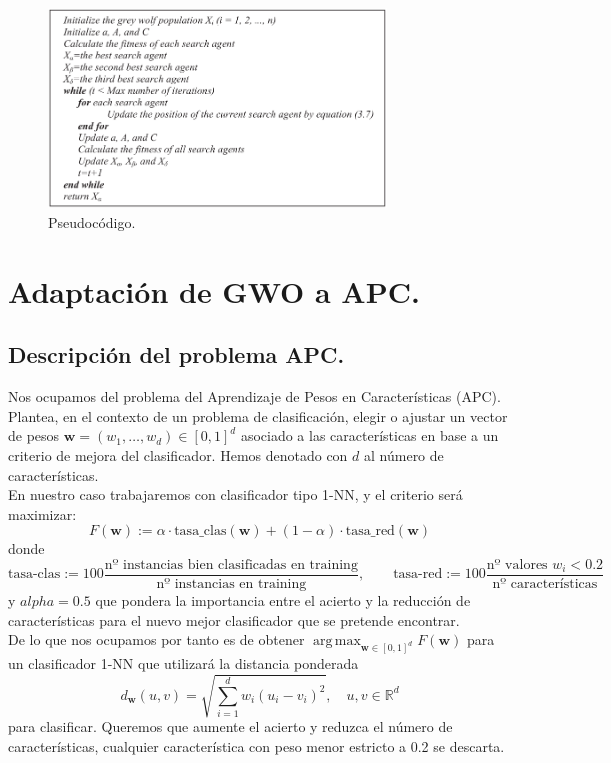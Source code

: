 \documentclass[11pt,a4paper]{article}
\DeclareMathOperator*{\argmax}{arg\,max}
\theoremstyle{definition}
\newcommand{\R}{\mathbb{R}}
\begin{document}
	\begin{figure}[H]
		\centering
		\includegraphics[width=0.8\textwidth]{images/gwo_pseudocode.png}
		\caption{Pseudocódigo.}
	\end{figure}

	\section{Adaptación de GWO a APC.}
	\subsection{Descripción del problema APC.}
	Nos ocupamos del problema del Aprendizaje de Pesos en Características (APC). Plantea, en el contexto de un problema de clasificación, elegir o ajustar un vector de pesos $\textbf{w}=(w_1,\ldots, w_d)\in [0,1]^d$ asociado a las características en base a un criterio de mejora del clasificador. Hemos denotado con $d$ al número de características.\\
	
	En nuestro caso trabajaremos con clasificador tipo 1-NN, y el criterio será maximizar:
	$$F(\textbf{w}):=\alpha\cdot \text{tasa\_clas}(\textbf{w})+(1-\alpha ) \cdot \text{tasa\_red}(\textbf{w})$$
	donde
	$$\text{tasa-clas}:=100\frac{\text{nº instancias bien clasificadas en training}}{\text{nº instancias en training}}, \quad \quad \text{tasa-red}:=100\frac{\text{nº valores } w_i <0.2}{\text{nº características}}$$
	y $alpha=0.5$ que pondera la importancia entre el acierto y la reducción de características para el nuevo mejor clasificador que se pretende encontrar.\\
	
	De lo que nos ocupamos por tanto es de obtener $\argmax_{\textbf{w}\in [0,1]^d} F(\textbf{w})$ para un clasificador 1-NN que utilizará la distancia ponderada
	$$d_{\textbf{w}}(u,v)=\sqrt{\sum_{i=1}^d w_i(u_i-v_i)^2}, \quad u,v\in \R^d$$
	para clasificar. Queremos que aumente el acierto y reduzca el número de características, cualquier característica con peso menor estricto a 0.2 se descarta.
	
\end{document}
